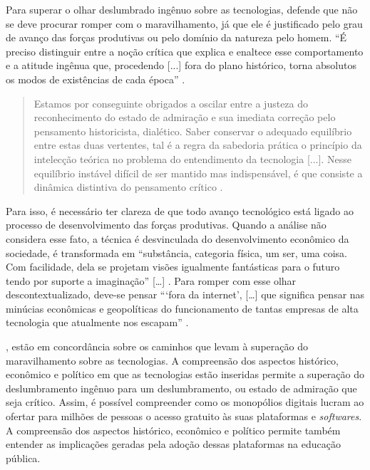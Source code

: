 \documentclass[portuguese]{textolivre}
\begin{document}
Para superar o olhar deslumbrado ingênuo sobre as tecnologias, \textcite{pinto_o_2005} defende que não se deve procurar romper com o maravilhamento, já que ele é justificado pelo grau de avanço das forças produtivas ou pelo domínio da natureza pelo homem. “É preciso distinguir entre a noção crítica que explica e enaltece esse comportamento e a atitude ingênua que, procedendo [...] fora do plano histórico, torna absolutos os modos de existências de cada época” \cite[p. 39]{pinto_o_2005}.

\begin{quote}
 Estamos por conseguinte obrigados a oscilar entre a justeza do reconhecimento do estado de admiração e sua imediata correção pelo pensamento historicista, dialético. Saber conservar o adequado equilíbrio entre estas duas vertentes, tal é a regra da sabedoria prática o princípio da intelecção teórica no problema do entendimento da tecnologia [...]. Nesse equilíbrio instável difícil de ser mantido mas indispensável, é que consiste a dinâmica distintiva do pensamento crítico \cite[p. 52]{pinto_o_2005}.
\end{quote}

Para isso, é necessário ter clareza de que todo avanço tecnológico está ligado ao processo de desenvolvimento das forças produtivas. Quando a análise não considera esse fato, a técnica é desvinculada do desenvolvimento econômico da sociedade, é transformada em “substância, categoria física, um ser, uma coisa. Com facilidade, dela se projetam visões igualmente fantásticas para o futuro tendo por suporte a imaginação” […] \cite[p. 50]{pinto_o_2005}. Para romper com esse olhar descontextualizado, deve-se pensar “‘fora da internet’, […] que significa pensar nas minúcias econômicas e geopolíticas do funcionamento de tantas empresas de alta tecnologia que atualmente nos escapam” \cite[p. 23]{morozov2018}.

\textcite{pinto_o_2005, freire_educar_2011, morozov2018}, estão em concordância sobre os caminhos que levam à superação do maravilhamento sobre as tecnologias. A compreensão dos aspectos histórico, econômico e político em que as tecnologias estão inseridas permite a superação do deslumbramento ingênuo para um deslumbramento, ou estado de admiração que seja crítico. Assim, é possível compreender como os monopólios digitais lucram ao ofertar para milhões de pessoas o acesso gratuito às suas plataformas e \emph{softwares}. A compreensão dos aspectos histórico, econômico e político permite também entender as implicações geradas pela adoção dessas plataformas na educação pública.
\end{document}
